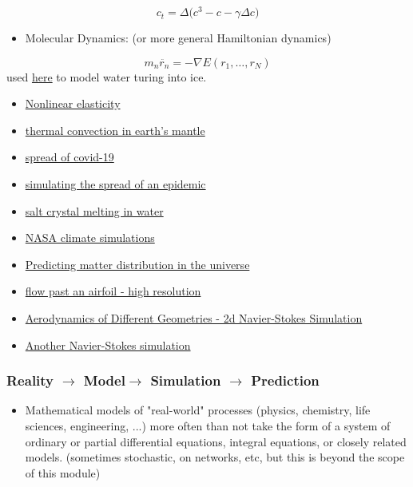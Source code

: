 \documentclass[12pt,landscape]{article}
\begin{document}
{\begin{itemize}
\end{itemize}
\[
c_t = \Delta \big( c^3 - c - \gamma \Delta c \big)
\]
\begin{itemize}
\item Molecular Dynamics: (or more general Hamiltonian dynamics)

\end{itemize}
\[
m_n \ddot{r_n} = - \nabla E(r_1, \dots, r_N)
\]
used \href{https://www.youtube.com/watch?v=zRUFzJrDtq0}{here} to model water turing into ice.

\begin{itemize}
\item \href{https://www.youtube.com/watch?v=u8Kfn2o7epQ}{Nonlinear elasticity}


\item \href{https://www.youtube.com/watch?v=-kDb0HlDsIM}{thermal convection in earth's mantle}


\item \href{https://www.youtube.com/watch?v=dbBmSBA7Kyw}{spread of covid-19}


\item \href{https://www.youtube.com/watch?v=gxAaO2rsdIs}{simulating the spread of an epidemic}


\item \href{https://www.youtube.com/watch?v=_0QhOCDzP4I&t}{salt crystal melting in water}


\item \href{https://www.youtube.com/watch?v=jj0WsQYtT7M}{NASA climate simulations}


\item \href{https://www.youtube.com/watch?v=rtBlZJ6gNiI}{Predicting matter distribution in the universe}


\item \href{https://www.youtube.com/watch?v=hz7UjN_vYuw}{flow past an airfoil - high resolution}


\item \href{https://www.youtube.com/watch?v=bJX8fVsq5oQ}{Aerodynamics of Different Geometries - 2d Navier-Stokes Simulation}


\item \href{https://www.youtube.com/watch?v=vOFcHqImXJ8}{Another Navier-Stokes simulation}

\end{itemize}
\subsubsection{Reality $\rightarrow$ Model$\rightarrow$ Simulation $\rightarrow$ Prediction}
\begin{itemize}
\item Mathematical models of "real-world" processes (physics, chemistry, life sciences, engineering, ...) more often than not take the form of a system of ordinary or partial differential equations, integral equations, or closely related models. (sometimes stochastic, on networks, etc, but this is beyond the scope of this module) 



\end{itemize}}
\end{document}
